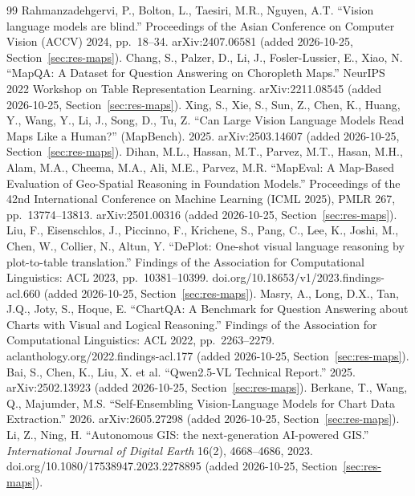 \begin{thebibliography}{99}
 Rahmanzadehgervi, P., Bolton, L., Taesiri, M.R., Nguyen, A.T. \textquotedblleft{}Vision language models are blind.\textquotedblright{} Proceedings of the Asian Conference on Computer Vision (ACCV) 2024, pp.\ 18--34. arXiv:2407.06581 (added 2026-10-25, Section~\ref{sec:res-maps}).
 Chang, S., Palzer, D., Li, J., Fosler-Lussier, E., Xiao, N. \textquotedblleft{}MapQA: A Dataset for Question Answering on Choropleth Maps.\textquotedblright{} NeurIPS 2022 Workshop on Table Representation Learning. arXiv:2211.08545 (added 2026-10-25, Section~\ref{sec:res-maps}).
 Xing, S., Xie, S., Sun, Z., Chen, K., Huang, Y., Wang, Y., Li, J., Song, D., Tu, Z. \textquotedblleft{}Can Large Vision Language Models Read Maps Like a Human?\textquotedblright{} (MapBench). 2025. arXiv:2503.14607 (added 2026-10-25, Section~\ref{sec:res-maps}).
 Dihan, M.L., Hassan, M.T., Parvez, M.T., Hasan, M.H., Alam, M.A., Cheema, M.A., Ali, M.E., Parvez, M.R. \textquotedblleft{}MapEval: A Map-Based Evaluation of Geo-Spatial Reasoning in Foundation Models.\textquotedblright{} Proceedings of the 42nd International Conference on Machine Learning (ICML 2025), PMLR 267, pp.\ 13774--13813. arXiv:2501.00316 (added 2026-10-25, Section~\ref{sec:res-maps}).
 Liu, F., Eisenschlos, J., Piccinno, F., Krichene, S., Pang, C., Lee, K., Joshi, M., Chen, W., Collier, N., Altun, Y. \textquotedblleft{}DePlot: One-shot visual language reasoning by plot-to-table translation.\textquotedblright{} Findings of the Association for Computational Linguistics: ACL 2023, pp.\ 10381--10399. doi.org/10.18653/v1/2023.findings-acl.660 (added 2026-10-25, Section~\ref{sec:res-maps}).
 Masry, A., Long, D.X., Tan, J.Q., Joty, S., Hoque, E. \textquotedblleft{}ChartQA: A Benchmark for Question Answering about Charts with Visual and Logical Reasoning.\textquotedblright{} Findings of the Association for Computational Linguistics: ACL 2022, pp.\ 2263--2279. aclanthology.org/2022.findings-acl.177 (added 2026-10-25, Section~\ref{sec:res-maps}).
 Bai, S., Chen, K., Liu, X. et al. \textquotedblleft{}Qwen2.5-VL Technical Report.\textquotedblright{} 2025. arXiv:2502.13923 (added 2026-10-25, Section~\ref{sec:res-maps}).
 Berkane, T., Wang, Q., Majumder, M.S. \textquotedblleft{}Self-Ensembling Vision-Language Models for Chart Data Extraction.\textquotedblright{} 2026. arXiv:2605.27298 (added 2026-10-25, Section~\ref{sec:res-maps}).
 Li, Z., Ning, H. \textquotedblleft{}Autonomous GIS: the next-generation AI-powered GIS.\textquotedblright{} \textit{International Journal of Digital Earth} 16(2), 4668--4686, 2023. doi.org/10.1080/17538947.2023.2278895 (added 2026-10-25, Section~\ref{sec:res-maps}).

\end{thebibliography}
